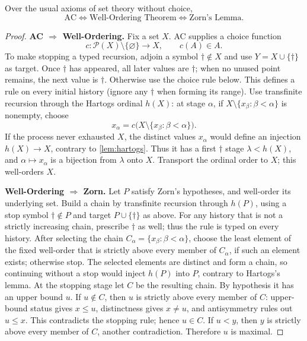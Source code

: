 \begin{theorem}
\label{thm:choice-equivalence}
Over the usual axioms of set theory without choice,
\[
\boxed{
\mathrm{AC}\Longleftrightarrow\text{Well-Ordering Theorem}
\Longleftrightarrow\text{Zorn's Lemma}.}
\]
\end{theorem}
\begin{proof}
\textbf{AC $\Rightarrow$ Well-Ordering.}
Fix a set $X$. AC supplies a choice function
\[
c:\mathcal P(X)\setminus\{\varnothing\}\longrightarrow X,
\qquad c(A)\in A.
\]
To make stopping a typed recursion, adjoin a symbol $\dagger\notin X$
and use $Y=X\cup\{\dagger\}$ as target. Once $\dagger$ has appeared,
all later values are $\dagger$; when no unused point remains, the next
value is $\dagger$. Otherwise use the choice rule below. This defines a
rule on every initial history (ignore any $\dagger$ when forming its range).
Use transfinite recursion through the Hartogs ordinal $h(X)$: at stage $\alpha$, if
$X\setminus\{x_\beta:\beta<\alpha\}$ is nonempty, choose
\[
x_\alpha=c\bigl(X\setminus\{x_\beta:\beta<\alpha\}\bigr).
\]
If the process never exhausted $X$, the distinct values $x_\alpha$ would
define an injection $h(X)\to X$, contrary to \cref{lem:hartogs}. Thus it
has a first $\dagger$ stage $\lambda<h(X)$, and $\alpha\mapsto x_\alpha$ is a bijection
from $\lambda$ onto $X$. Transport the ordinal order to $X$; this well-orders
$X$.

\textbf{Well-Ordering $\Rightarrow$ Zorn.}
Let $P$ satisfy Zorn's hypotheses, and well-order its underlying set. Build
a chain by transfinite recursion through $h(P)$, using a stop symbol
$\dagger\notin P$ and target $P\cup\{\dagger\}$ as above. For any history
that is not a strictly increasing chain, prescribe $\dagger$ as well;
thus the rule is typed on every history. After selecting the chain
$C_\alpha=\{x_\beta:\beta<\alpha\}$, choose the least element of the fixed
well-order that is strictly above every member of $C_\alpha$, if such an
element exists; otherwise stop. The selected elements are distinct and form
a chain, so continuing without a stop would inject $h(P)$ into $P$,
contrary to Hartogs's lemma.
At the stopping stage let $C$ be the resulting chain. By hypothesis it has
an upper bound $u$. If $u\notin C$, then $u$ is strictly above every member
of $C$: upper-bound status gives $x\leq u$, distinctness gives $x\ne u$,
and antisymmetry rules out $u\leq x$. This contradicts the stopping rule;
hence $u\in C$. If $u<y$, then
$y$ is strictly above every member of $C$, another contradiction. Therefore
$u$ is maximal.


\end{proof}
